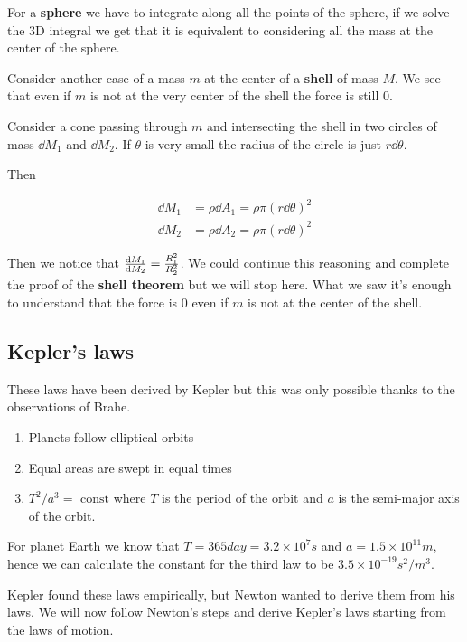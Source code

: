 \documentclass[10pt]{extarticle}
\begin{document}
For a \textbf{sphere} we have to integrate along all the points of the sphere, if we solve the 3D integral we get that it is equivalent to considering all the mass at the center of the sphere.

Consider another case of a mass $m$ at the center of a \textbf{shell} of mass $M$. We see that even if $m$ is not at the very center of the shell the force is still 0.

Consider a cone passing through $m$ and intersecting the shell in two circles of mass $\dd{M_1}$ and $\dd{M_2}$. If $\theta$ is very small the radius of the circle is just $r \dd{\theta}$.

Then

\begin{align*}
    \dd{M_1} & = \rho \dd{A_1} = \rho \pi (r \dd{\theta})^2 \\
    \dd{M_2} & = \rho \dd{A_2} = \rho \pi (r \dd{\theta})^2
\end{align*}

Then we notice that $\dv{M_1}{M_2} = \frac{R_1^2}{R_2^2}$. We could continue this reasoning and complete the proof of the \textbf{shell theorem} but we will stop here.
What we saw it's enough to understand that the force is 0 even if $m$ is not at the center of the shell.

\subsection{Kepler's laws}

These laws have been derived by Kepler but this was only possible thanks to the observations of Brahe.

\begin{enumerate}
    \item Planets follow elliptical orbits
    \item Equal areas are swept in equal times
    \item $T^2 / a^3 = \text{ const}$ where $T$ is the period of the orbit and $a$ is the semi-major axis of the orbit.
\end{enumerate}

For planet Earth we know that $T = 365 \si{day} = 3.2 \times 10^7 \si{s}$ and $a = 1.5 \times 10^{11} \si{m}$, hence we can calculate the constant for the third law to be $3.5 \times 10^{-19} \si{s^2/m^3}$.

Kepler found these laws empirically, but Newton wanted to derive them from his laws. We will now follow Newton's steps and derive Kepler's laws starting from the laws of motion.
\end{document}
